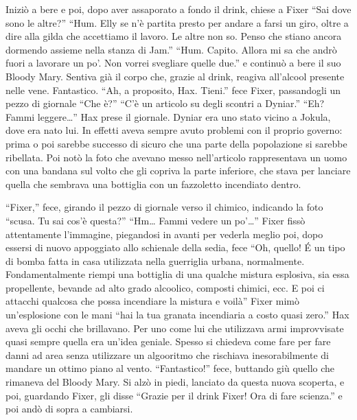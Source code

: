     Iniziò a bere e poi, dopo aver assaporato a fondo il drink, chiese a
    Fixer ``Sai dove sono le altre?'' ``Hum. Elly se n'è partita presto per
    andare a farsi un giro, oltre a dire alla gilda che accettiamo il
    lavoro. Le altre non so. Penso che stiano ancora dormendo assieme nella
    stanza di Jam.'' ``Hum. Capito. Allora mi sa che andrò fuori a lavorare
    un po'. Non vorrei svegliare quelle due.'' e continuò a bere il suo
    Bloody Mary. Sentiva già il corpo che, grazie al drink, reagiva
    all'alcool presente nelle vene. Fantastico. ``Ah, a proposito, Hax.
    Tieni.'' fece Fixer, passandogli un pezzo di giornale ``Che è?'' ``C'è
    un articolo su degli scontri a Dyniar.'' ``Eh? Fammi leggere\dots{}''
    Hax prese il giornale. Dyniar era uno stato vicino a Jokula, dove era
    nato lui. In effetti aveva sempre avuto problemi con il proprio
    governo: prima o poi sarebbe successo di sicuro che una parte della
    popolazione si sarebbe ribellata. Poi notò la foto che avevano messo
    nell'articolo rappresentava un uomo con una bandana sul volto che gli
    copriva la parte inferiore, che stava per lanciare quella che sembrava
    una bottiglia con un fazzoletto incendiato dentro.

    ``Fixer,'' fece, girando il pezzo di giornale verso il chimico,
    indicando la foto ``scusa. Tu sai cos'è questa?'' ``Hm\dots{} Fammi
    vedere un po'\dots{}'' Fixer fissò attentamente l'immagine, piegandosi
    in avanti per vederla meglio poi, dopo essersi di nuovo appoggiato allo
    schienale della sedia, fece ``Oh, quello! \'E un tipo di bomba fatta in
    casa utilizzata nella guerriglia urbana, normalmente. Fondamentalmente
    riempi una bottiglia di una qualche mistura esplosiva, sia essa
    propellente, bevande ad alto grado alcoolico, composti chimici, ecc. E
    poi ci attacchi qualcosa che possa incendiare la mistura e voilà''
    Fixer mimò un'esplosione con le mani ``hai la tua granata incendiaria a
    costo quasi zero.'' Hax aveva gli occhi che brillavano. Per uno come
    lui che utilizzava armi improvvisate quasi sempre quella era un'idea
    geniale. Spesso si chiedeva come fare per fare danni ad area senza
    utilizzare un algooritmo che rischiava inesorabilmente di mandare un
    ottimo piano al vento. ``Fantastico!'' fece, buttando giù quello che
    rimaneva del Bloody Mary. Si alzò in piedi, lanciato da questa nuova
    scoperta, e poi, guardando Fixer, gli disse ``Grazie per il drink
    Fixer! Ora di fare scienza.'' e poi andò di sopra a cambiarsi.

